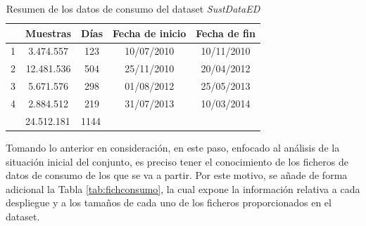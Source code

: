 \begin{table}[h!]
    \centering
    \begin{tabular}{c|c|c|cc}
    \hline
    \rowcolor[HTML]{C0C0C0} 
    \multicolumn{1}{|l|}{\cellcolor[HTML]{C0C0C0}Despliegue} & \multicolumn{1}{l|}{\cellcolor[HTML]{C0C0C0}Muestras} & \multicolumn{1}{l|}{\cellcolor[HTML]{C0C0C0}Días} & \multicolumn{1}{l|}{\cellcolor[HTML]{C0C0C0}Fecha de inicio} & \multicolumn{1}{l|}{\cellcolor[HTML]{C0C0C0}Fecha de fin} \\ \hline
    \multicolumn{1}{|c|}{1} & 3.474.557 & 123 & \multicolumn{1}{c|}{10/07/2010} & \multicolumn{1}{c|}{10/11/2010} \\ \hline
    \multicolumn{1}{|c|}{2} & 12.481.536 & 504 & \multicolumn{1}{c|}{25/11/2010} & \multicolumn{1}{c|}{20/04/2012} \\ \hline
    \multicolumn{1}{|c|}{3} & 5.671.576 & 298 & \multicolumn{1}{c|}{01/08/2012} & \multicolumn{1}{c|}{25/05/2013} \\ \hline
    \multicolumn{1}{|c|}{4} & 2.884.512 & 219 & \multicolumn{1}{c|}{31/07/2013} & \multicolumn{1}{c|}{10/03/2014} \\ \hline
    \multicolumn{1}{l|}{} & \multicolumn{1}{l|}{\cellcolor[HTML]{EFEFEF}24.512.181} & \multicolumn{1}{l|}{\cellcolor[HTML]{EFEFEF}1144} & \multicolumn{1}{l}{} & \multicolumn{1}{l}{} \\ \cline{2-3}
    \end{tabular}
    \caption{Resumen de los datos de consumo del dataset \textit{SustDataED} \cite{sustdata}}
    \label{tab:resumen}
\end{table}

\vspace{3mm}

Tomando lo anterior en consideración, en este paso, enfocado al análisis de la situación inicial del conjunto, es preciso tener el conocimiento de los ficheros de datos de consumo de los que se va a partir. Por este motivo, se añade de forma adicional la Tabla \ref{tab:fichconsumo}, la cual expone la información relativa a cada despliegue y a los tamaños de cada uno de los ficheros proporcionados en el dataset.  

\vspace{3mm}

